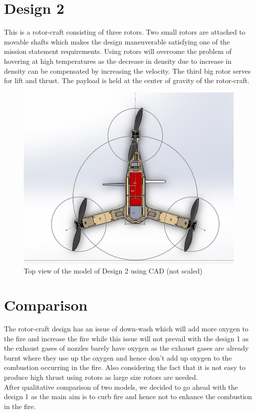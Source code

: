 \section{Design 2}
This is a rotor-craft consisting of three rotors.  Two small rotors are attached to movable shafts which makes the design maneuverable satisfying one of the mission statement requirements. Using rotors will overcome the problem of hovering at high temperatures as the decrease in density due to increase in density can be compensated by increasing the velocity. The third big rotor serves for lift and thrust. The payload is held at the center of gravity of the rotor-craft.
\begin{figure}[H]
\centering
\includegraphics[scale = 0.5]{fig3.jpg}
\caption{Top view of the model of Design 2 using CAD (not scaled)}
\label{Fig3.3}
\end{figure}
\section{Comparison}
The rotor-craft design has an issue of down-wash which will add more oxygen to the fire and increase the fire while this issue will not prevail with the design 1 as the exhaust gases of nozzles barely have oxygen as the exhaust gases are already burnt where they use up the oxygen and hence don’t add up oxygen to the combustion occurring in the fire. Also considering the fact that it is not easy to produce high thrust using rotors as large size rotors are needed.\\ 
After qualitative comparison of two models, we decided to go ahead with the design 1 as the main aim is to curb fire and hence not to enhance the combustion in the fire.
